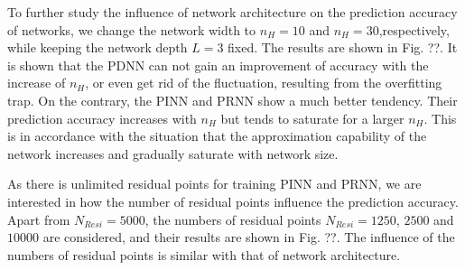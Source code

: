 \documentclass[preprint, 10pt]{elsarticle}
\begin{document}
To further study the influence of network architecture on the prediction accuracy of networks, we change the network width to $n_H=10$ and $n_H=30$,respectively, while keeping the network depth $L=3$ fixed. The results are shown in Fig. ??. It is shown that the PDNN can not gain an improvement of accuracy with the increase of $n_H$, or even get rid of the fluctuation, resulting from the overfitting trap. On the contrary, the PINN and PRNN show a much better tendency. Their prediction accuracy increases with $n_H$ but tends to saturate for a larger $n_H$. This is in accordance with the situation that the approximation capability of the network increases and gradually saturate with network size.

As there is unlimited residual points for training PINN and PRNN, we are interested in how the number of residual points influence the prediction accuracy. Apart from $N_{Resi}=5000$, the numbers of residual points $N_{Resi}=1250$, $2500$ and $10000$ are considered, and their results are shown in Fig. ??. The influence of the numbers of residual points is similar with that of network architecture.
\end{document}
